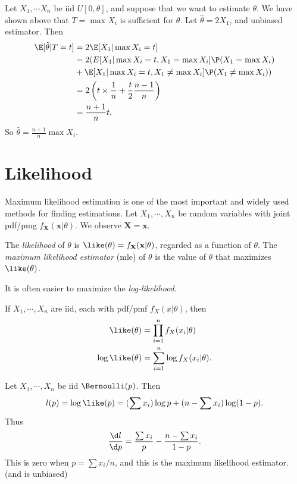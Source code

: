 \documentclass[a4paper]{article}
\begin{document}
\begin{eg}
  Let $X_1, \cdots X_n$ be iid $U[0, \theta]$, and suppose that we want to estimate $\theta$. We have shown above that $T = \max X_i$ is sufficient for $\theta$. Let $\hat{\theta} = 2X_1$, and unbiased estimator. Then
  \begin{align*}
    \E[\tilde{\theta}|T = t] &= 2\E[X_1|\max X_i = t]\\
    &= 2(E[X_1|\max X_i = t, X_1 = \max X_i]\P(X_1 = \max X_i)\\
    &+ \E[X_1|\max X_i = t, X_1 \not= \max X_i] \P(X_1 \not= \max X_i))\\
    &= 2\left(t\times \frac{1}{n} + \frac{t}{2}\frac{n - 1}{n}\right)\\
    &= \frac{n + 1}{n}t.
  \end{align*}
  So $\hat{\theta} = \frac{n + 1}{n}\max X_i$.
\end{eg}

\section{Likelihood}
Maximum likelihood estimation is one of the most important and widely used methods for finding estimations. Let $X_1, \cdots , X_n$ be random variables with joint pdf/pmg $f_\mathbf{X}(\mathbf{x}|\theta)$. We observe $\mathbf{X} = \mathbf{x}$.

\begin{defi}[Likelihood]
  The \emph{likelihood} of $\theta$ is $\like(\theta) = f_\mathbf{X}(\mathbf{x} | \theta)$, regarded as a function of $\theta$. The \emph{maximum likelihood estimator} (mle) of $\theta$ is the value of $\theta$ that maximizes $\like (\theta)$.
\end{defi}
It is often easier to maximize the \emph{log-likelihood}.

If $X_1, \cdots, X_n$ are iid, each with pdf/pmf $f_X(x|\theta)$, then
\begin{align*}
  \like(\theta) &= \prod_{i = 1}^n f_X(x_i|\theta)\\
  \log\like (\theta) &= \sum_{i = 1}^n \log f_X(x_i|\theta).
\end{align*}

\begin{eg}
  Let $X_1, \cdots, X_n$ be iid $\Bernoulli(p)$. Then
  \[
    l(p) =\log\like(p) = (\sum x_i)\log p + (n - \sum x_i)\log(1 - p).
  \]
  Thus
  \[
    \frac{\d l}{\d p} = \frac{\sum x_i}{p} - \frac{n - \sum x_i}{1 - p}.
  \]
  This is zero when $p = \sum x_i /n$, and this is the maximum likelihood estimator. (and is unbiased)
\end{eg}
\end{document}
